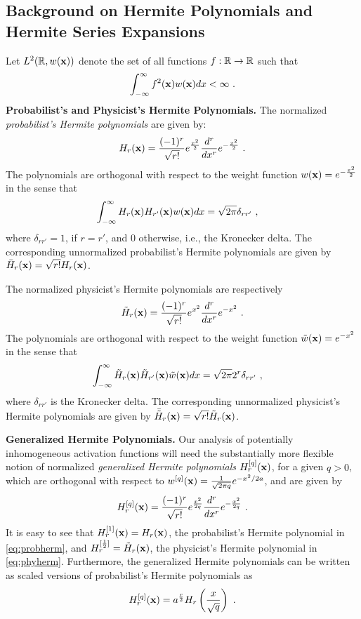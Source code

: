 \subsection{Background on Hermite Polynomials and Hermite Series Expansions}
\label{ssec:ghermite}
Let $L^2(\mathbb{R},w(\mathbf{x}))$ denote the set of all functions $f : \mathbb{R} \to \mathbb{R}$ such that 
\begin{align}
    \int_{-\infty}^{\infty} f^2(\mathbf{x}) w(\mathbf{x}) dx < \infty~.
\end{align}
{\bf Probabilist's and Physicist's Hermite Polynomials.} The normalized \emph{probabilist's Hermite  polynomials} are given by:
\begin{align}
H_r(\mathbf{x}) = \frac{(-1)^r}{\sqrt{r!}} e^{\frac{x^2}{2}} \frac{d^r}{dx^r} e^{-\frac{x^2}{2}}~.
\label{eq:probherm}
\end{align}
The polynomials are orthogonal with respect to the weight function $w(\mathbf{x}) = e^{-\frac{x^2}{2}}$ in the sense that
\begin{align}
\int_{-\infty}^{\infty} H_r(\mathbf{x}) H_{r'}(\mathbf{x}) w(\mathbf{x}) dx & = \sqrt{2\pi} \delta_{r r'}~,
\end{align}
where $\delta_{r r'} = 1$, if $r=r'$, and 0 otherwise, i.e., the Kronecker delta. The corresponding unnormalized probabilist's Hermite polynomials are given by $\bar{H}_r(\mathbf{x}) = \sqrt{r!} H_r(\mathbf{x})$. 

The normalized physicist's Hermite polynomials are respectively
\begin{align}
\tilde{H}_r(\mathbf{x}) = \frac{(-1)^r}{\sqrt{r!}} e^{x^2} \frac{d^r}{dx^r} e^{-x^2}~.
\label{eq:phyherm}
\end{align}
The polynomials are orthogonal with respect to the weight function $\tilde{w}(\mathbf{x}) = e^{-x^2}$ in the sense that
\begin{align}
\int_{-\infty}^{\infty} \tilde{H}_r(\mathbf{x}) \tilde{H}_{r'}(\mathbf{x}) \tilde{w}(\mathbf{x}) dx & = \sqrt{2\pi} 2^r \delta_{r r'}~,
\end{align}
where $\delta_{r r'}$ is the Kronecker delta. The corresponding unnormalized physicist's Hermite polynomials are given by $\bar{\tilde{H}}_r(\mathbf{x}) = \sqrt{r!} \tilde{H}_r(\mathbf{x})$. 

{\bf Generalized Hermite Polynomials.} Our analysis of potentially inhomogeneous activation functions will need the substantially more flexible notion of normalized \emph{generalized Hermite polynomials} $H_r^{[q]}(\mathbf{x})$, for a given $q>0$, which are orthogonal with respect to $w^{[q]}(\mathbf{x}) = \frac{1}{\sqrt{2\pi q}} e^{-x^2/2a}$, and are given by
\begin{align}
    H_r^{[q]}(\mathbf{x}) =  \frac{(-1)^r}{\sqrt{r!}} e^{\frac{x^2}{2q}} \frac{d^r}{dx^r} e^{-\frac{x^2}{2q}}~.
\label{eq:genherm}
\end{align}
It is easy to see that $H_r^{[1]}(\mathbf{x}) = H_r(\mathbf{x})$, the probabilist's Hermite polynomial in \eqref{eq:probherm}, and $H_r^{[\frac{1}{2}]} = \tilde{H}_r(\mathbf{x})$, the physicist's Hermite polynomial in \eqref{eq:phyherm}. Furthermore, the generalized Hermite polynomials can be written as scaled versions of probabilist's Hermite polynomials as
\begin{align}
    H_r^{[q]}(\mathbf{x}) = a^{\frac{r}{2}} H_r\left( \frac{x}{\sqrt{q}} \right)~.
\label{eq:hermtrans}
\end{align}

